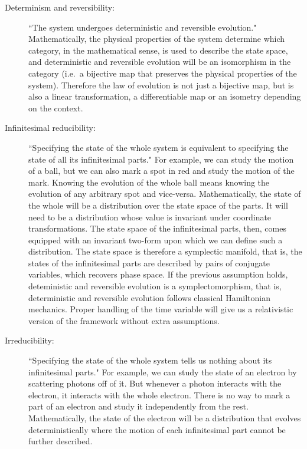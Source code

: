 \documentclass[11pt,letterpaper,fleqn]{memoir} %
\begin{document}
\begin{description}
	\item[Determinism and reversibility:] ``The system undergoes deterministic and reversible evolution." Mathematically, the physical properties of the system determine which category, in the mathematical sense, is used to describe the state space, and deterministic and reversible evolution will be an isomorphism in the category (i.e.~a bijective map that preserves the physical properties of the system). Therefore the law of evolution is not just a bijective map, but is also a linear transformation, a differentiable map or an isometry depending on the context.
	
	\item[Infinitesimal reducibility:] ``Specifying the state of the whole system is equivalent to specifying the state of all its infinitesimal parts." For example, we can study the motion of a ball, but we can also mark a spot in red and study the motion of the mark. Knowing the evolution of the whole ball means knowing the evolution of any arbitrary spot and vice-versa. Mathematically, the state of the whole will be a distribution over the state space of the parts. It will need to be a distribution whose value is invariant under coordinate transformations. The state space of the infinitesimal parts, then, comes equipped with an invariant two-form upon which we can define such a distribution. The state space is therefore a symplectic manifold, that is,
	the states of the infinitesimal parts are described by pairs of conjugate variables, which recovers phase space. If the previous assumption holds, deteministic and reversible evolution is a symplectomorphism, that is,  deterministic and reversible evolution follows classical Hamiltonian mechanics. Proper handling of the time variable will give us a relativistic version of the framework without extra assumptions.
	
	\item[Irreducibility:] ``Specifying the state of the whole system tells us nothing about its infinitesimal parts." For example, we can study the state of an electron by scattering photons off of it. But whenever a photon interacts with the electron, it interacts with the whole electron. There is no way to mark a part of an electron and study it independently from the rest. Mathematically, the state of the electron will be a distribution that evolves deterministically where the motion of each infinitesimal part cannot be further described.
	

\end{description}
\end{document}
